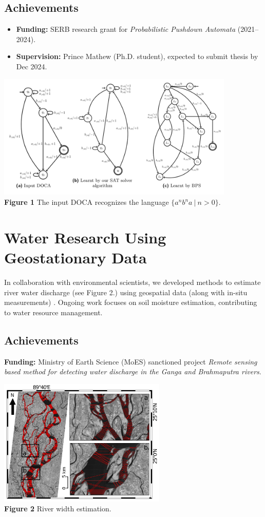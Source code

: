 \documentclass[11pt,a4paper,sans]{moderncv} %
\begin{document}
\subsection{Achievements}
\begin{itemize}
    \item \textbf{Funding:} SERB research grant for \emph{Probabilistic Pushdown Automata} (2021--2024).
    \item \textbf{Supervision:} Prince Mathew (Ph.D. student), expected to submit thesis by Dec 2024.
\end{itemize}
\begin{minipage}{\textwidth}
\includegraphics[width=0.85\textwidth]{doca.png} \\
\textbf{Figure 1} The input DOCA recognizes the language $\{a^nb^na ~|~ n > 0\}$.
\end{minipage}


\section{Water Research Using Geostationary Data}
In collaboration with environmental scientists, we developed methods to estimate river water discharge (see Figure 2.) using geospatial data (along with in-situ measurements) \cite{esd21}. Ongoing work focuses on soil moisture estimation, contributing to water resource management.

\subsection{Achievements}
\textbf{Funding:} Ministry of Earth Science (MoES) sanctioned project \emph{Remote sensing based method
for detecting water discharge in the Ganga and Brahmaputra rivers}.

\begin{minipage}{\textwidth}
\includegraphics[width=0.6\textwidth]{river-width.png} \\
  \textbf{Figure 2} River width estimation.
\end{minipage}
\end{document}
